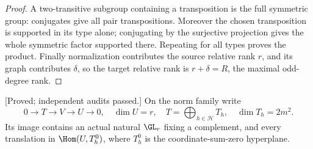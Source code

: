 \begin{proof}
A two-transitive subgroup containing a transposition is the full
symmetric group: conjugates give all pair transpositions.
Moreover the chosen transposition is supported in its type alone;
conjugating by the surjective projection gives the whole symmetric
factor supported there. Repeating for all types proves the product.
Finally normalization contributes the source relative rank $r$,
and its graph contributes $\delta$, so the target relative rank
is $r+\delta=R$, the maximal odd-degree rank.
\end{proof}

\begin{proposition}
\label{prop:good-theta-uniform-gluing-candidate}
\textup{[Proved; independent audits passed.]}
On the norm family write
\[
 0\longrightarrow T\longrightarrow V\longrightarrow U\longrightarrow0,
 \quad\dim U=r,\quad
 T=\bigoplus_{h\in\mathcal H}T_h,\quad\dim T_h=2m^2.
\]
Its image contains an actual natural $\GL_r$ fixing a complement,
and every translation in $\Hom(U,T_h^0)$, where $T_h^0$ is the
coordinate-sum-zero hyperplane.
\end{proposition}
